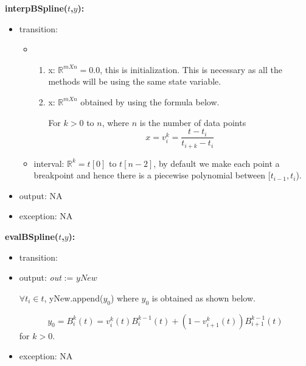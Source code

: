 \documentclass[12pt, titlepage]{article}
\begin{document}
\noindent \textbf{interpBSpline($t$,$y$):}
\begin{itemize}
	\item transition: 
	
		\begin{itemize}
		\item 
		\begin{enumerate}
			\item x: $\mathbb{R}^{m X n} = 0.0 $, this is initialization. 
			This is necessary as all the methods will be using the same state 
			variable.
			
			\item x: $\mathbb{R}^{m X n}$ obtained by using the formula below.
			
			For $k>0$ to $n$, where $n$ is the number of data points
			\begin{equation*}
			x = v_i ^k = \frac{t-t_i}{t_{i+k} - t_i}
			\end{equation*}
			
			
		\end{enumerate}
		\item interval: $\mathbb{R}^{k} = t[0] $ to $t[n-2]$, by default we 
		make each point a breakpoint and hence there is a piecewise polynomial 
		between [$t_{i-1},t_i$).
	\end{itemize}
	
	
	 
	\item output: NA 	
	 
	\item exception: NA 
\end{itemize}


\noindent \textbf{evalBSpline($t$,$y$):}
\begin{itemize}
	\item transition: 
	
	\item output:  \textit{out} := $yNew$
	
	$\forall t_i \in t$, yNew.append($y_0$) where $y_0$ is obtained as shown 
	below.
	
	\begin{equation*}
	y_0 = B_i ^k (t) = v_i ^k (t) B_i ^{k-1} (t) + (1 - v_{i+1} ^k (t))B_{i+1} 
	^{k-1} 
	(t)
	\end{equation*} 
	for $k>0$.\\
	\item exception: NA
\end{itemize}
\end{document}
